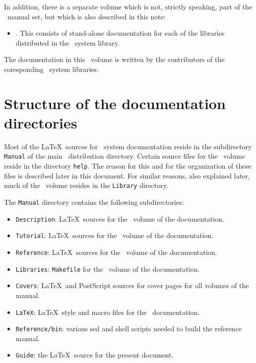 \documentclass[12pt]{article}
\begin{document}
\noindent In addition, there is a separate volume which is not, strictly
speaking, part of the \HOL\ manual set, but which is also described in this
note:

\begin{itemize}

\item \LIBRARIES. This consists of stand-alone documentation for each of the
libraries distributed in the \HOL\ system library.

\end{itemize}

\noindent The documentation in this \LIBRARIES\ volume is written by the
contributors of the coresponding \HOL\ system libraries.

\section{Structure of the documentation directories}

Most of the \LaTeX\ sources for \HOL\ system documentation reside in the
subdirectory {\tt Manual} of the main \HOL\ distribution directory.  Certain
source files for the \REFERENCE\ volume reside in the directory {\tt help}. The
reason for this and for the organization of these files is described later in
this document.  For similar reasons, also explained later, much of the
\LIBRARIES\ volume resides in the {\tt Library} directory.

The {\tt Manual} directory contains the following subdirectories:

\begin{itemize}

\item {\tt Description}: \LaTeX\ sources for the \DESCRIPTION\ volume
of the documentation.

\item {\tt Tutorial}: \LaTeX\ sources for the \TUTORIAL\ volume
of the documentation.

\item {\tt Reference}: \LaTeX\ sources for the \REFERENCE\ volume
of the documentation.

\item {\tt Libraries}: {\tt Makefile} for the \LIBRARIES\ volume
of the documentation.

\item {\tt Covers}: \LaTeX\ and PostScript sources for cover pages
for all volumes of the manual.

\item {\tt LaTeX}: \LaTeX\ style and macro files for the \HOL\ documentation.

\item {\tt Reference/bin}: various sed and shell scripts needed to build the
reference manual.

\item {\tt Guide}: the \LaTeX\ source for the present document.

\end{itemize}
\end{document}
